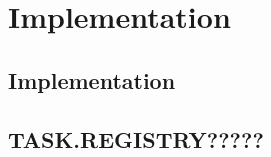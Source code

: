 \chapter{Implementation}
\label{ch:implementation} %
\section{Implementation}

\section{TASK.REGISTRY?????}
